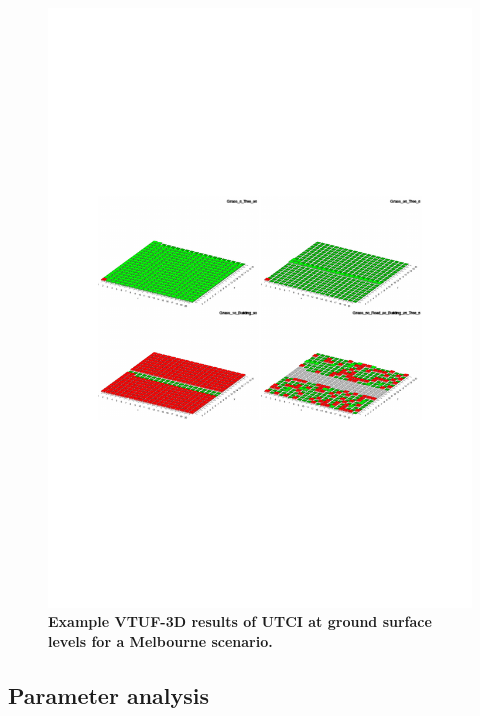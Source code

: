 \documentclass[final,3p,times,authoryear]{elsarticle}
\begin{document}
\begin{figure}
\centering
\includegraphics[page=2,trim={75 240 60 240},clip,scale=0.35]{Figures/PresentationImages.pdf}
\caption{\bf Example VTUF-3D results of UTCI at ground surface levels for a Melbourne scenario.}
 \label{fig:vtufresults}
\end{figure} 

\subsection{Parameter analysis}\label{sec:methodsparam}
\end{document}
